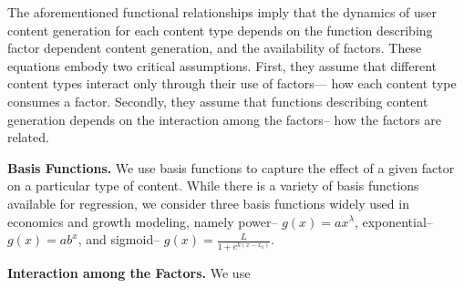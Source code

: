 The aforementioned functional relationships imply that the dynamics of user content generation for each content type depends on the function describing factor dependent content generation, and the availability of factors. These equations embody two critical assumptions. First, they assume that different content types interact only through their use of factors--- how each content type consumes a factor. Secondly, they assume that functions describing content generation depends on the interaction among the factors-- how the factors are related.

\textbf{Basis Functions.} We use basis functions to capture the effect of a given factor on a particular type of content. While there is a variety of basis functions available for regression, we consider three basis functions widely used in economics and growth modeling, namely power-- $g(x) = ax^{\lambda}$, exponential-- $g(x) = ab^x$, and sigmoid-- $g(x) = \frac{L}{1+e^{k(x-x_0)}}$. 

\textbf{Interaction among the Factors.} We use 





